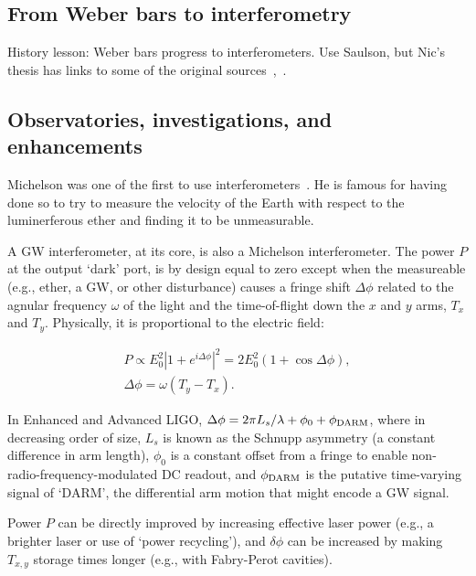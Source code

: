         \subsection{From Weber bars to interferometry}
        \label{bars_to_interferometry}

            History lesson: Weber bars progress to interferometers. Use Saulson, but Nic's thesis has links to some of the original sources~\cite{Saulson},~\cite{SmithThesis}.           

        \subsection{Observatories, investigations, and enhancements}
        \label{methods}

		Michelson was one of the first to use interferometers~\cite{michelson}. He is famous for having done so to try to measure the velocity of the Earth with respect to the luminerferous ether and finding it to be unmeasurable.

A GW interferometer, at its core, is also a Michelson interferometer. 
The power $P$ at the output `dark' port, is by design equal to zero except when the measureable (e.g., ether, a GW, or other disturbance) causes a fringe shift $\Delta \phi$ related to the agnular frequency $\omega$ of the light and the time-of-flight down the $x$ and $y$ arms, $T_x$ and $T_y$. 
Physically, it is proportional to the electric field: 

\begin{eqnarray}
P \propto E_0^2 \left| 1 + e^{i \Delta \phi}\right|^2 = 2 E_0^2 (1 + \cos \Delta \phi), \\
\Delta \phi = \omega (T_y - T_x).
\end{eqnarray}

In Enhanced and Advanced LIGO, $\Delta \phi = 2\pi L_s /\lambda + \phi_0 + \phi_{\textup{DARM}} $, where in decreasing order of size, $L_s$ is known as the Schnupp asymmetry (a constant difference in arm length), $\phi_0$ is a constant offset from a fringe to enable non-radio-frequency-modulated DC readout, and $\phi_{\textup{DARM}}$ is the putative time-varying signal of `DARM', the differential arm motion that might encode a GW signal. 

Power $P$ can be directly improved by increasing effective laser power (e.g., a brighter laser or use of `power recycling'), and $\delta \phi$ can be increased by making $T_{x,y}$ storage times longer (e.g., with Fabry-Perot cavities).

